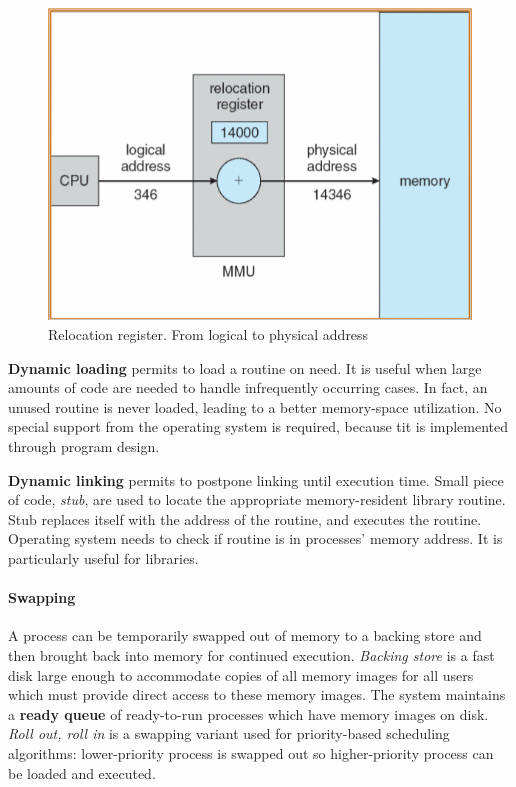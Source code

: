 \begin{figure}[hbtp]
\centering
\includegraphics[scale=0.4]{images/memory_management/relocation_register.jpg}
\caption{Relocation register. From logical to physical address}
\end{figure}

\textbf{Dynamic loading} permits to load a routine on need. It is useful when large amounts of code are needed to handle infrequently occurring cases. In fact, an unused routine is never loaded, leading to a better memory-space utilization. No special support from the operating system is required, because tit is implemented through program design.

\textbf{Dynamic linking} permits to postpone linking until execution time. Small piece of code, \emph{stub}, are used to locate the appropriate memory-resident library routine. Stub replaces itself with the address of the routine, and executes the routine. Operating system needs to check if routine is in processes' memory address. It is particularly useful for libraries.

\paragraph{Swapping}
A process can be temporarily swapped out of memory to a backing store and then brought back into memory for continued execution. \emph{Backing store} is a fast disk large enough to accommodate copies of all memory images for all users which must provide direct access to these memory images. The system maintains a \textbf{ready queue} of ready-to-run processes which have memory images on disk. \emph{Roll out, roll in} is a swapping variant used for priority-based scheduling algorithms: lower-priority process is swapped out so higher-priority process can be loaded and executed.

